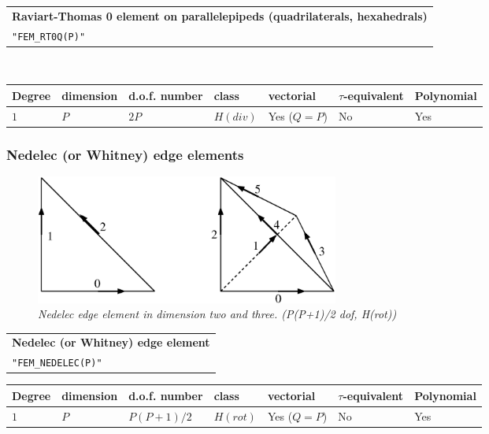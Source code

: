 \documentclass[10pt,a4paper]{article}
\begin{document}
\begin{center}
\begin{tabular}{|m{16.11cm}|} \hline 
{\bf Raviart-Thomas 0 element on parallelepipeds (quadrilaterals, hexahedrals)}\\
{\tt "FEM\_RT0Q(P)"}
\end{tabular} \\ \vspace{-1pt} 
\begin{tabular}{|m{2cm}|m{2cm}|m{2.5cm}|m{1.2cm}|m{2cm}|m{2cm}|m{1.8cm}|} \hline 
Degree & dimension & d.o.f. number & class & vectorial & \mbox{$\tau$-equivalent} & Polynomial\\ \hline
$1$ & $P$ & $2P$ & $H(div)$ & Yes \mbox{($Q = P$)} & No & Yes\\ \hline
\end{tabular}
\end{center}




\subsubsection{Nedelec (or Whitney) edge elements}

\begin{figure}[H]
  \begin{center}
    \includegraphics[width=10cm,angle=0]{getfemlist_nedelec.eps}
  \end{center}
  \caption{ \it Nedelec edge element in dimension two and three. (P(P+1)/2 dof, H(rot))} 
  \label{fig:triangle_comp}
\end{figure}

\begin{center}
\begin{tabular}{|m{16.11cm}|} \hline 
{\bf Nedelec (or Whitney) edge element}\\
{\tt "FEM\_NEDELEC(P)"}
\end{tabular} %
\begin{tabular}{|m{2cm}|m{2cm}|m{2.5cm}|m{1.2cm}|m{2cm}|m{2cm}|m{1.8cm}|} \hline 
Degree & dimension & d.o.f. number & class & vectorial & \mbox{$\tau$-equivalent} & Polynomial\\ \hline
$1$ & $P$ & $P(P+1)/2$ & $H(rot)$ & Yes \mbox{($Q = P$)} & No & Yes\\ \hline
\end{tabular}
\end{center}
\end{document}
